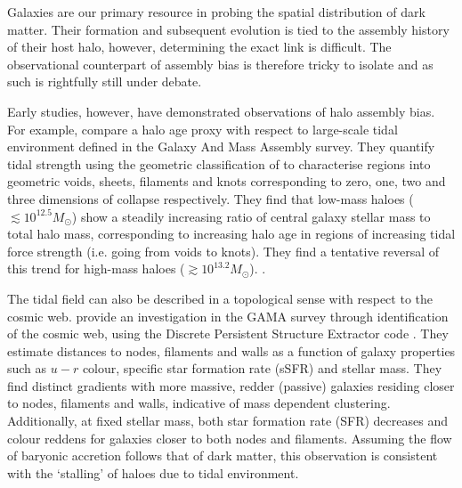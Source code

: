 Galaxies are our primary resource in probing the spatial distribution of dark matter. Their formation and subsequent evolution is tied to the assembly history of their host halo, however, determining the exact link is difficult. The observational counterpart of assembly bias is therefore tricky to isolate and as such is rightfully still under debate. 

Early studies, however, have demonstrated observations of halo assembly bias. For example, \citet{tojeiro2017} compare a halo age proxy with respect to large-scale tidal environment defined in the Galaxy And Mass Assembly \citep[GAMA;][]{driver2009, driver2011} survey. They quantify tidal strength using the geometric classification of \citet{eardley2015} to characterise regions into geometric voids, sheets, filaments and knots corresponding to zero, one, two and three dimensions of collapse respectively. They find that low-mass haloes ($\lesssim 10^{12.5} M_{\odot}$) show a steadily increasing ratio of central galaxy stellar mass to total halo mass, corresponding to increasing halo age in regions of increasing tidal force strength (i.e. going from voids to knots). They find a tentative reversal of this trend for high-mass haloes ($\gtrsim 10^{13.2} M_{\odot}$). \citep[See][who explicitly look for changes in halo to stellar mass ratio with geometric environment using stacked lensing profiles, but find no significant changes when averaging over halo mass.]{brouwer2016}.

The tidal field can also be described in a topological sense with respect to the cosmic web. \citet{kraljic2018} provide an investigation in the GAMA survey through identification of the cosmic web, using the Discrete Persistent Structure Extractor code \citep[DisPerSE;][]{sousbie2011a,sousbie2011b}.  They estimate distances to nodes, filaments and walls as a function of galaxy properties such as $u - r$ colour, specific star formation rate (sSFR) and stellar mass. They find distinct gradients with more massive, redder (passive) galaxies residing closer to nodes, filaments and walls, indicative of mass dependent clustering. Additionally, at fixed stellar mass, both star formation rate (SFR) decreases and colour reddens for galaxies closer to both nodes and filaments. Assuming the flow of baryonic accretion follows that of dark matter, this observation is consistent with the `stalling' of haloes due to tidal environment. 

